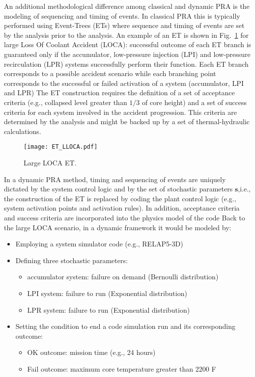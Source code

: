 An additional methodological difference among classical and dynamic PRA is the modeling of sequencing
and timing of events. In classical PRA this is typically performed using Event-Trees (ETs) where  
sequence and timing of events are set by the analysis prior to the analysis.
An example of an ET is shown in Fig.~\ref{fig:LLOCA_ET} for large Loss Of Coolant Accident (LOCA): successful 
outcome of each ET branch is guaranteed only if the accumulator, low-pressure injection (LPI) and low-pressure 
recirculation (LPR) systems successfully perform their function. 
Each ET branch corresponds to a possible accident scenario while each branching point corresponds to the 
successful or failed activation of a system (accumulator, LPI and LPR) 
The ET construction requires the definition of a set of acceptance criteria (e.g., collapsed level greater 
than $1/3$ of core height) and a set of success criteria for each system involved in the accident progression.
This criteria are determined by the analysis and might be backed up by a set of thermal-hydraulic calculations.

\begin{figure}
    \centering
    \centerline{\texttt{[image: ET\_LLOCA.pdf]}} 
    \caption{Large LOCA ET.}
    \label{fig:LLOCA_ET}
\end{figure}

In a dynamic PRA method, timing and sequencing of events are uniquely dictated by the system control logic
and by the set of stochastic parameters $\boldsymbol s$,i.e., the construction of the ET is replaced by coding 
the plant control logic (e.g., system activation points and activation rules).
In addition, acceptance criteria and success criteria are incorporated into the physics model of the code
Back to the large LOCA scenario, in a dynamic framework it would be modeled by:
\begin{itemize}
  \item Employing a system simulator code (e.g., RELAP5-3D) 
  \item Defining three stochastic parameters: 
        \begin{itemize}
          \item accumulator system: failure on demand (Bernoulli distribution)
          \item LPI system: failure to run (Exponential distribution)
          \item LPR system: failure to run (Exponential distribution)
        \end{itemize}
   \item Setting the condition to end a code simulation run and its corresponding outcome:
        \begin{itemize}
          \item OK outcome: mission time (e.g., 24 hours)
          \item Fail outcome: maximum core temperature greater than 2200 F 
        \end{itemize}       
\end{itemize}

